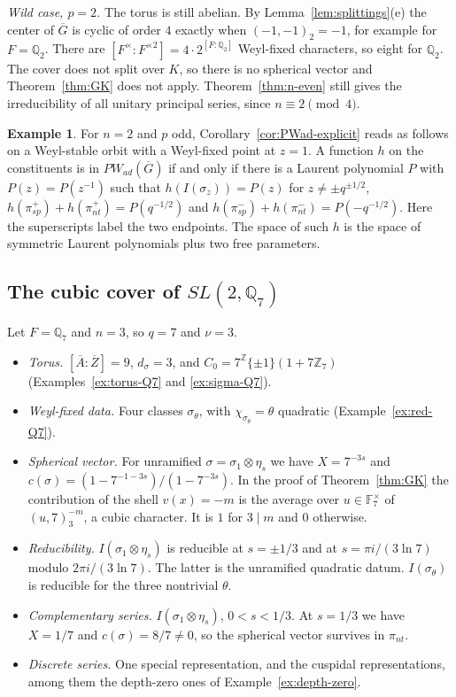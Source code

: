 \documentclass[12pt,letterpaper]{article}
\numberwithin{equation}{section}
\theoremstyle{definition}
\newtheorem{example}[theorem]{Example}
\newcommand{\Z}{\mathbb Z}
\newcommand{\Q}{\mathbb Q}
\newcommand{\bG}{\overline{G}}
\newcommand{\bA}{\overline{A}}
\newcommand{\bZ}{\overline{Z}}
\begin{document}
\emph{Wild case, $p=2$.}  The torus is still abelian.  By Lemma~\ref{lem:splittings}(e) the
center of $\bG$ is cyclic of order $4$ exactly when $(-1,-1)_2=-1$, for example for
$F=\Q_2$.  There are $[F^\times:F^{\times2}]=4\cdot2^{[F:\Q_2]}$ Weyl-fixed characters, so
eight for $\Q_2$.  The cover does not split over $K$, so there is no spherical vector and
Theorem~\ref{thm:GK} does not apply.  Theorem~\ref{thm:n-even} still gives the
irreducibility of all unitary principal series, since $n\equiv2\pmod4$.

\begin{example}\label{ex:PW-n2}
For $n=2$ and $p$ odd, Corollary~\ref{cor:PWad-explicit} reads as follows on a Weyl-stable
orbit with a Weyl-fixed point at $z=1$.  A function $h$ on the constituents is in
$PW_{ad}(\bG)$ if and only if there is a Laurent polynomial $P$ with $P(z)=P(z^{-1})$ such
that $h(I(\sigma_z))=P(z)$ for $z\ne\pm q^{\pm1/2}$,
$h(\pi_{sp}^+)+h(\pi_{nt}^+)=P(q^{-1/2})$ and $h(\pi_{sp}^-)+h(\pi_{nt}^-)=P(-q^{-1/2})$.
Here the superscripts label the two endpoints.  The space of such $h$ is the space of
symmetric Laurent polynomials plus two free parameters.
\end{example}

\subsection{\texorpdfstring{The cubic cover of $SL(2,\Q_7)$}{The cubic cover of SL(2,Q7)}}

Let $F=\Q_7$ and $n=3$, so $q=7$ and $\nu=3$.
\begin{itemize}[leftmargin=*,itemsep=1pt]
\item \emph{Torus.}  $[\bA:\bZ]=9$, $d_\sigma=3$, and $C_0=7^{\Z}\{\pm1\}(1+7\Z_7)$
(Examples~\ref{ex:torus-Q7} and \ref{ex:sigma-Q7}).
\item \emph{Weyl-fixed data.}  Four classes $\sigma_\theta$, with $\chi_{\sigma_\theta}=\theta$
quadratic (Example~\ref{ex:red-Q7}).
\item \emph{Spherical vector.}  For unramified $\sigma=\sigma_1\otimes\eta_s$ we have
$X=7^{-3s}$ and $c(\sigma)=(1-7^{-1-3s})/(1-7^{-3s})$.  In the proof of
Theorem~\ref{thm:GK} the contribution of the shell $v(x)=-m$ is the average over
$u\in\mathbb F_7^\times$ of $(u,7)_3^{-m}$, a cubic character.  It is $1$ for $3\mid m$ and
$0$ otherwise.
\item \emph{Reducibility.} $I(\sigma_1\otimes\eta_s)$ is reducible at $s=\pm1/3$
and at $s=\pi i/(3\ln7)$ modulo $2\pi i/(3\ln7)$.
The latter is the unramified quadratic datum. $I(\sigma_\theta)$ is reducible
for the three nontrivial $\theta$.
\item \emph{Complementary series.}  $I(\sigma_1\otimes\eta_s)$, $0<s<1/3$.  At $s=1/3$ we
have $X=1/7$ and $c(\sigma)=8/7\ne0$, so the spherical vector survives in $\pi_{nt}$.
\item \emph{Discrete series.}  One special representation, and the cuspidal
representations, among them the depth-zero ones of Example~\ref{ex:depth-zero}.
\end{itemize}
\end{document}
